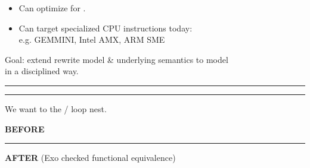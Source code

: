 {\LARGE
\begin{itemize}
  \item Can optimize for .
  \item Can target specialized CPU instructions today:\\e.g. GEMMINI, Intel AMX, ARM SME
\end{itemize}
Goal: extend rewrite model \& underlying semantics to model\\ in a disciplined way.

}
\vfill
\hrule
{\large

}


\newpage
{}

{\large

}

\vspace{3mm}
\hrule

{\LARGE
We want to  the / loop nest.

}


\newpage
{}

{\large

}

\newpage
{}

{\large

}

\newpage
{}

{\large

}

\newpage
{}

{\large

}

\newpage
{}

{\large

}

\newpage
{\large
\textbf{\LARGE BEFORE}\\

}

\vspace{1mm}
\hrule

{\large
{\LARGE \textbf{AFTER} (Exo checked functional equivalence)}\\

}

\newpage
{}


